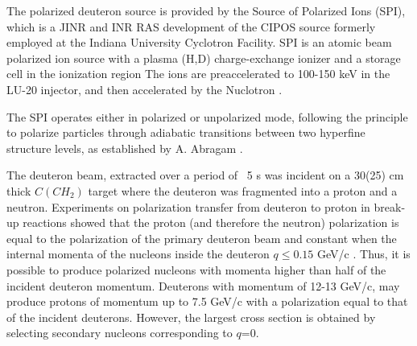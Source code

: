 \documentclass[epj]{svjour}
\begin{document}
The polarized deuteron source is provided by the Source of Polarized Ions (SPI), which is a JINR and INR RAS development of the CIPOS source \cite{Agapov:2004uu} formerly employed at the Indiana University Cyclotron Facility. SPI is an atomic beam polarized ion source with a plasma (H,D) charge-exchange ionizer and a storage cell in the ionization region
The ions are  preaccelerated to 100-150 keV in the LU-20 injector, and then accelerated by the Nuclotron \cite{Fimushkin:2016uu}. 

The SPI operates either in polarized or unpolarized mode, following the principle to polarize particles through adiabatic transitions between two hyperfine structure levels, as established by A. Abragam \cite{abragam1961}. 




The deuteron beam, extracted over a period of ~5 s was incident on a 30(25) cm thick $C(CH_2)$ target  where the deuteron was fragmented into a proton and a neutron. Experiments on polarization transfer from deuteron to proton in break-up reactions showed that the proton (and therefore the neutron) polarization is equal to the polarization of the primary deuteron beam and constant when the internal momenta of the nucleons inside the deuteron $q\le 0.15$ GeV/c \cite{Azhgirey:2008}. Thus, it is possible to produce polarized nucleons with momenta higher than half of the incident deuteron momentum. Deuterons with momentum of 12-13 GeV/c, may produce protons of momentum up to 7.5 GeV/c with a polarization equal to that of the incident deuterons. However, the largest cross section is obtained by selecting secondary nucleons corresponding to  $q$=0. 
\end{document}
